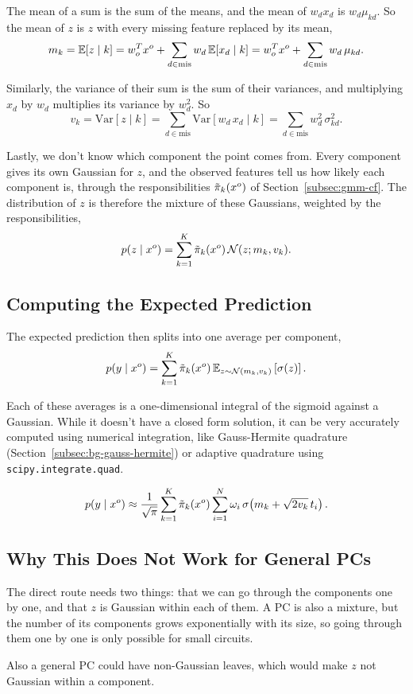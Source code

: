 The mean of a sum is the sum of the means, and the mean of $w_d x_d$ is
$w_d \mu_{kd}$. So the mean of $z$ is $z$ with every missing feature replaced by
its mean,
\[
  m_k = \mathbb{E}[z \mid k] = w_o^T x^o + \sum_{d \in \mathrm{mis}} w_d\, \mathbb{E}[x_d \mid k] = w_o^T x^o + \sum_{d \in \mathrm{mis}} w_d\, \mu_{kd}.
\]

Similarly, the variance of their sum is the sum of their
variances, and multiplying $x_d$ by $w_d$ multiplies its variance by $w_d^2$. So
\[
  v_k = \mathrm{Var}[z \mid k] = \sum_{d \in \mathrm{mis}} \mathrm{Var}[w_d\, x_d \mid k] = \sum_{d \in \mathrm{mis}} w_d^2\, \sigma_{kd}^2.
\]

Lastly, we don't  know which component the point comes from. Every component
gives its own Gaussian for $z$, and the observed features tell us how likely each
component is, through the responsibilities $\tilde{\pi}_k(x^o)$ of
Section~\ref{subsec:gmm-cf}. The distribution of $z$ is therefore the mixture of
these Gaussians, weighted by the responsibilities,
\[
  p(z \mid x^o) = \sum_{k=1}^{K} \tilde{\pi}_k(x^o)\, \mathcal{N}(z; m_k, v_k).
\]

\subsection{Computing the Expected Prediction}

The expected prediction then splits into one average per component,
\[
  p(y \mid x^o) = \sum_{k=1}^{K} \tilde{\pi}_k(x^o)\, \mathbb{E}_{z \sim \mathcal{N}(m_k, v_k)} \left[ \sigma(z) \right].
\]

Each of these averages is a one-dimensional integral of the sigmoid against a
Gaussian. While it doesn't have a closed form solution, it can be very accurately computed using 
numerical integration, like Gauss-Hermite quadrature (Section~\ref{subsec:bg-gauss-hermite}) or adaptive quadrature using \texttt{scipy.integrate.quad}.

\[
  p(y \mid x^o) \approx \frac{1}{\sqrt{\pi}} \sum_{k=1}^{K} \tilde{\pi}_k(x^o) \sum_{i=1}^{N} \omega_i\, \sigma\!\left( m_k + \sqrt{2 v_k}\, t_i \right).
\]

\subsection{Why This Does Not Work for General PCs}

The direct route needs two things: that we can go through the components one by
one, and that $z$ is Gaussian within each of them. A PC is also a mixture, but the
number of its components grows exponentially with its size, so going through them
one by one is only possible for small circuits. 

Also a general PC could have non-Gaussian leaves, which would make $z$ not Gaussian within a component.
